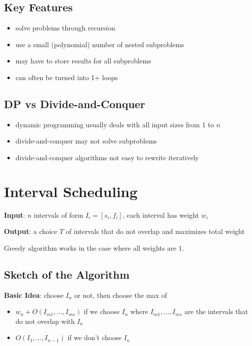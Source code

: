 \documentclass[11pt]{article}
\begin{document}
\subsection{Key Features}
\label{sec:orgbaed5d4}
\begin{itemize}
\item solve problems through recursion
\item use a small (polynomial) number of nested subproblems
\item may have to store results for all subproblems
\item can often be turned into 1+ loops
\end{itemize}
\subsection{DP vs Divide-and-Conquer}
\label{sec:org560efae}
\begin{itemize}
\item dynamic programming usually deals with all input sizes from 1 to \(n\)
\item divide-and-conquer may not solve subproblems
\item divide-and-conquer algorithms not easy to rewrite iteratively
\end{itemize}
\section{Interval Scheduling}
\label{sec:org79253aa}
\textbf{Input}: \(n\) intervals of form \(I_{i} = [s_{i}, f_{i}]\), each interval has weight \(w_{i}\)

\textbf{Output}: a choice \(T\) of intervals that do not overlap and maximizes total weight

Greedy algorithm works in the case where all weights are 1.
\subsection{Sketch of the Algorithm}
\label{sec:orgb3f9f8d}
\textbf{Basic Idea}: choose \(I_{n}\) or not, then choose the max of
\begin{itemize}
\item \(w_{n} + O(I_{m1}, \dots, I_{ms})\) if we choose \(I_{n}\) where
\(I_{m1}, \dots, I_{ms}\) are the intervals that do not overlap with \(I_{n}\)
\item \(O(I_{1}, \dots, I_{n-1})\) if we don't choose \(I_{n}\)
\end{itemize}
\end{document}
